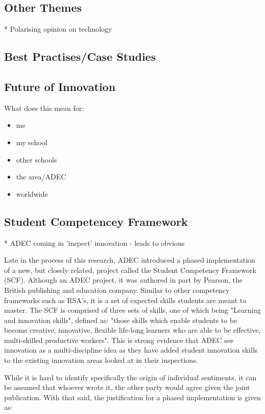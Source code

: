 \subsection{Other Themes}
* Polarising opinion on technology

\subsection{Best Practises/Case Studies}

\subsection{Future of Innovation}


What does this mean for:
\begin{itemize}
\item me
\item my school
\item other schools
\item the area/ADEC
\item worldwide
\end{itemize}

\subsection{Student Competencey Framework}
* ADEC coming in 'inspect' innovation - leads to obvious

Late in the process of this research, ADEC introduced a phased implementation of a new, but closely related, project called the Student Competency Framework (SCF). Although an ADEC project, it was authored in part by Pearson, the British publishing and education company. Similar to other competency frameworks such as RSA's, it is a set of expected skills students are meant to master. The SCF is comprised of three sets of skills, one of which being "Learning and innovation skills", defined as: "those skills which enable students to be become creative, innovative, flexible life-long learners who are able to be effective, multi-skilled productive workers". This is strong evidence that ADEC see innovation as a multi-discipline idea as they have added student innovation skills to the existing innovation areas looked at in their inspections.

While it is hard to identify specifically the origin of individual sentiments, it can be assumed that whoever wrote it, the other party would agree given the joint publication. With that said, the justification for a phased implementation is given as:

